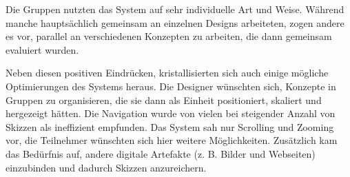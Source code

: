 Die Gruppen nutzten das System auf sehr individuelle Art und Weise. Während manche hauptsächlich gemeinsam an einzelnen Designs arbeiteten, zogen andere es vor, parallel an verschiedenen Konzepten zu arbeiten, die dann gemeinsam evaluiert wurden.

Neben diesen positiven Eindrücken, kristallisierten sich auch einige mögliche Optimierungen des Systems heraus. Die Designer wünschten sich, Konzepte in Gruppen zu organisieren, die sie dann als Einheit positioniert, skaliert und hergezeigt hätten. Die Navigation wurde von vielen bei steigender Anzahl von Skizzen als ineffizient empfunden. Das System sah nur Scrolling und Zooming vor, die Teilnehmer wünschten sich hier weitere Möglichkeiten. Zusätzlich kam das Bedürfnis auf, andere digitale Artefakte (z. B. Bilder und Webseiten) einzubinden und dadurch Skizzen anzureichern.


